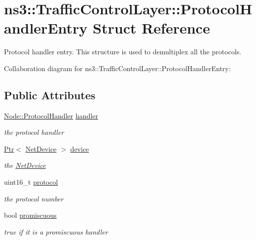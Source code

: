 \hypertarget{structns3_1_1TrafficControlLayer_1_1ProtocolHandlerEntry}{}\section{ns3\+:\+:Traffic\+Control\+Layer\+:\+:Protocol\+Handler\+Entry Struct Reference}
\label{structns3_1_1TrafficControlLayer_1_1ProtocolHandlerEntry}


Protocol handler entry. This structure is used to demultiplex all the protocols.  




Collaboration diagram for ns3\+:\+:Traffic\+Control\+Layer\+:\+:Protocol\+Handler\+Entry\+:
\subsection*{Public Attributes}
\begin{DoxyCompactItemize}
\item 
\hyperlink{classns3_1_1Node_a4ce20b9442f89703d242ce3a3fa3dbf2}{Node\+::\+Protocol\+Handler} \hyperlink{structns3_1_1TrafficControlLayer_1_1ProtocolHandlerEntry_a3027250ecb8790cab33703183507cdfb}{handler}
\begin{DoxyCompactList}\small\item\em the protocol handler \end{DoxyCompactList}\item 
\hyperlink{classns3_1_1Ptr}{Ptr}$<$ \hyperlink{classns3_1_1NetDevice}{Net\+Device} $>$ \hyperlink{structns3_1_1TrafficControlLayer_1_1ProtocolHandlerEntry_ae5c4ab674ac903b7e9e3c01a095a0f4e}{device}
\begin{DoxyCompactList}\small\item\em the \hyperlink{classns3_1_1NetDevice}{Net\+Device} \end{DoxyCompactList}\item 
uint16\+\_\+t \hyperlink{structns3_1_1TrafficControlLayer_1_1ProtocolHandlerEntry_a83b258c5fa435c0cdcbf251e79b10ac4}{protocol}
\begin{DoxyCompactList}\small\item\em the protocol number \end{DoxyCompactList}\item 
bool \hyperlink{structns3_1_1TrafficControlLayer_1_1ProtocolHandlerEntry_a35b19b21a9cdf4075020b6c3ff255f8c}{promiscuous}
\begin{DoxyCompactList}\small\item\em true if it is a promiscuous handler \end{DoxyCompactList}\end{DoxyCompactItemize}


